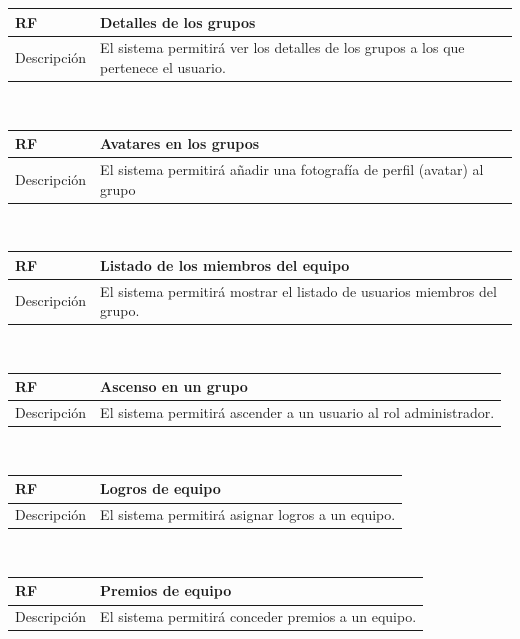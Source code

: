 \documentclass[twoside]{report}
\newcommand\addrow[2]{#1 &#2\\ }
\newcommand\addheading[2]{#1 &#2\\ \hline}
\newcommand\tabularhead{\begin{tabular}{lp{0.7\textwidth}}
\hline
}
\newenvironment{req}{\tabularhead}
{\hline\end{tabular}}
\begin{document}
\vspace{0.25cm}

\begin{req}
	\addheading{\textbf{RF\arabic{functionalRequirements}}}{Detalles de los grupos}
	\addrow{Descripción}{El sistema permitirá ver los detalles de los grupos a los que pertenece el usuario.}
\end{req}\\

\vspace{0.25cm}

\begin{req}
	\addheading{\textbf{RF\arabic{functionalRequirements}}}{Avatares en los grupos}
	\addrow{Descripción}{El sistema permitirá añadir una fotografía de perfil (avatar) al grupo}
\end{req}\\

\vspace{0.25cm}

\begin{req}
	\addheading{\textbf{RF\arabic{functionalRequirements}}}{Listado de los miembros del equipo}
	\addrow{Descripción}{El sistema permitirá mostrar el listado de usuarios miembros del grupo. }
\end{req}\\

\vspace{0.25cm}

\begin{req}
	\addheading{\textbf{RF\arabic{functionalRequirements}}}{Ascenso en un grupo}
	\addrow{Descripción}{El sistema permitirá ascender a un usuario al rol administrador. }
\end{req}\\

\begin{req}
	\addheading{\textbf{RF\arabic{functionalRequirements}}}{Logros de equipo}
	\addrow{Descripción}{El sistema permitirá asignar logros a un equipo. }
\end{req}\\

\begin{req}
	\addheading{\textbf{RF\arabic{functionalRequirements}}}{Premios de equipo}
	\addrow{Descripción}{El sistema permitirá conceder premios a un equipo.}
\end{req}\\
\end{document}
